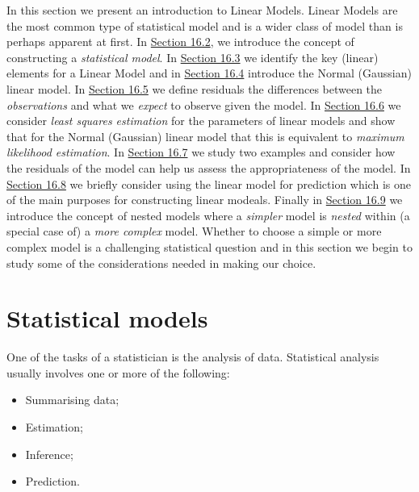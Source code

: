 \documentclass[
]{book}
\providecommand{\tightlist}{%
  \setlength{\itemsep}{0pt}\setlength{\parskip}{0pt}}
\begin{document}
In this section we present an introduction to Linear Models. Linear Models are the most common type of statistical model and is a wider class of model than is perhaps apparent at first. In \protect\hyperlink{Sec_LinearI:stat}{Section 16.2},
we introduce the concept of constructing a \emph{statistical model}. In \protect\hyperlink{Sec_LinearI:linear}{Section 16.3} we identify the key (linear) elements for a Linear Model and in \protect\hyperlink{Sec_LinearI:gauss}{Section 16.4} introduce the Normal (Gaussian) linear model. In \protect\hyperlink{Sec_LinearI:residuals}{Section 16.5} we define residuals the differences between the \emph{observations} and what we \emph{expect} to observe given the model. In \protect\hyperlink{Sec_LinearI:line}{Section 16.6} we consider \emph{least squares estimation} for the parameters of linear models and show that for the Normal (Gaussian) linear model that this is equivalent to \emph{maximum likelihood estimation}. In \protect\hyperlink{Sec_LinearI:Examples}{Section 16.7} we study two examples and consider how the residuals of the model can help us assess the appropriateness of the model. In \protect\hyperlink{Sec_LinearI:Prediction}{Section 16.8} we briefly consider using the linear model for prediction which is one of the main purposes for constructing linear modeals. Finally in \protect\hyperlink{Sec_LinearI:Nested}{Section 16.9} we introduce the concept of nested models where a \emph{simpler} model is \emph{nested} within (a special case of) a \emph{more complex} model. Whether to choose a simple or more complex model is a challenging statistical question and in this section we begin to study some of the considerations needed in making our choice.

\hypertarget{Sec_LinearI:stat}{%
\section{Statistical models}\label{Sec_LinearI:stat}}

One of the tasks of a statistician is the analysis of data. Statistical analysis usually involves one or more of the following:

\begin{itemize}
\tightlist
\item
  Summarising data;\\
\item
  Estimation;\\
\item
  Inference;\\
\item
  Prediction.
\end{itemize}
\end{document}

